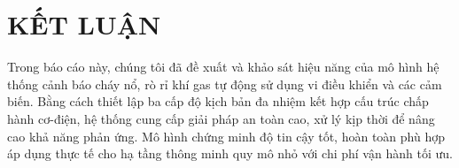 \section{KẾT LUẬN}
Trong báo cáo này, chúng tôi đã đề xuất và khảo sát hiệu năng của mô hình hệ thống cảnh báo cháy nổ, rò rỉ khí gas tự động sử dụng vi điều khiển và các cảm biến. Bằng cách thiết lập ba cấp độ kịch bản đa nhiệm kết hợp cấu trúc chấp hành cơ-điện, hệ thống cung cấp giải pháp an toàn cao, xử lý kịp thời để nâng cao khả năng phản ứng. Mô hình chứng minh độ tin cậy tốt, hoàn toàn phù hợp áp dụng thực tế cho hạ tầng thông minh quy mô nhỏ với chi phí vận hành tối ưu.
